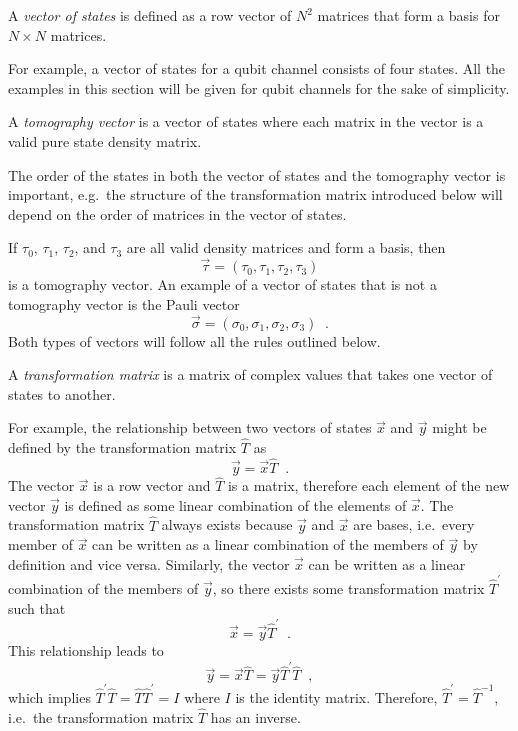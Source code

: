 \begin{definition}
A {\em vector of states} is defined as a row vector of $N^2$ matrices that form a basis for $N\times N$ matrices.
\end{definition}
For example, a vector of states for a qubit channel consists of four states.  All the examples in this section will be given for qubit channels for the sake of simplicity.  
\begin{definition}
A {\em tomography vector} is a vector of states where each matrix in the vector is a valid pure state density matrix.
\end{definition}
The order of the states in both the vector of states and the tomography vector is important, e.g.\ the structure of the transformation matrix introduced below will depend on the order of matrices in the vector of states.

If $\tau_0$, $\tau_1$, $\tau_2$, and $\tau_3$ are all valid density matrices and form a basis, then
$$
\vec{\tau} = (\tau_0,\tau_1,\tau_2,\tau_3)
$$
is a tomography vector.  An example of a vector of states that is not a tomography vector is the Pauli vector
$$
\vec{\sigma} = (\sigma_0,\sigma_1,\sigma_2,\sigma_3)\;\;.
$$ 
Both types of vectors will follow all the rules outlined below.

\begin{definition}
A {\em transformation matrix} is a matrix of complex values that takes one vector of states to another.
\end{definition}

For example, the relationship between two vectors of states $\vec{x}$ and $\vec{y}$ might be defined by the transformation matrix $\hat{T}$ as
$$
\vec{y} = \vec{x}\hat{T}\;\;.
$$
The vector $\vec{x}$ is a row vector and $\hat{T}$ is a matrix, therefore each element of the new vector $\vec{y}$ is defined as some linear combination of the elements of $\vec{x}$.  The transformation matrix $\hat{T}$ always exists because $\vec{y}$ and $\vec{x}$ are bases, i.e.\ every member of $\vec{x}$ can be written as a linear combination of the members of $\vec{y}$ by definition and vice versa.  Similarly, the vector $\vec{x}$ can be written as a linear combination of the members of $\vec{y}$, so there exists some transformation matrix $\hat{T}^\prime$ such that
$$
\vec{x} = \vec{y}\hat{T}^\prime\;\;.
$$
This relationship leads to
$$
\vec{y} = \vec{x}\hat{T} = \vec{y}\hat{T}^\prime\hat{T}\;\;,
$$
which implies $\hat{T}^\prime\hat{T}=\hat{T}\hat{T}^\prime=I$ where $I$ is the identity matrix.  Therefore, $\hat{T}^\prime = \hat{T}^{-1}$, i.e.\ the transformation matrix $\hat{T}$ has an inverse.

